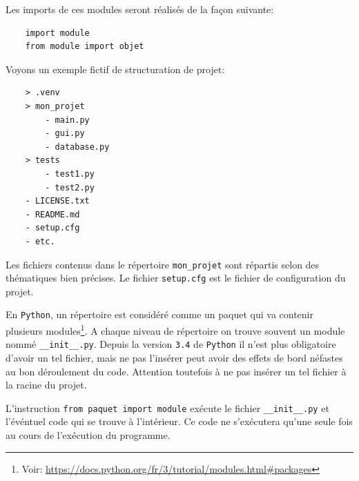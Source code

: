 \documentclass[a4paper,11pt]{book}
\begin{document}
Les imports de ces modules seront réalisés de la façon suivante:
\begin{verbatim}
    import module
    from module import objet
\end{verbatim}
\medskip

Voyons un exemple fictif de structuration de projet:
\begin{verbatim}
    > .venv
    > mon_projet
        - main.py
        - gui.py
        - database.py
    > tests
        - test1.py
        - test2.py
    - LICENSE.txt
    - README.md
    - setup.cfg
    - etc.
\end{verbatim}
\medskip

Les fichiers contenus dans le répertoire \texttt{mon\_projet} sont répartis selon des thématiques bien précises. Le fichier \texttt{setup.cfg} est le fichier de configuration du projet.
\medskip

En \texttt{Python}, un répertoire est considéré comme un paquet qui va contenir plusieurs modules\footnote{Voir: \url{https://docs.python.org/fr/3/tutorial/modules.html\#packages}}. A chaque niveau de répertoire on trouve souvent un module nommé \texttt{\_\_init\_\_.py}. Depuis la version \texttt{3.4} de \texttt{Python} il n'est plus obligatoire d'avoir un tel fichier, mais ne pas l'insérer peut avoir des effets de bord néfastes au bon déroulement du code. Attention toutefois à ne pas insérer un tel fichier à la racine du projet.
\medskip

L'instruction \texttt{from paquet import module} exécute le fichier \texttt{\_\_init\_\_.py} et l'événtuel code qui se trouve à l'intérieur. Ce code ne s'exécutera qu'une seule fois au cours de l'exécution du programme.
\medskip
\end{document}
